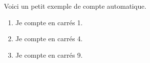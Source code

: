 \documentclass[12pt]{article}
\begin{document}
Voici un petit exemple de compte automatique.

\begin{enumerate}[label=\arabic*)]
    \item Je compte en carrés 1.
    \item Je compte en carrés 4.
    \item Je compte en carrés 9.
\end{enumerate}
\end{document}
